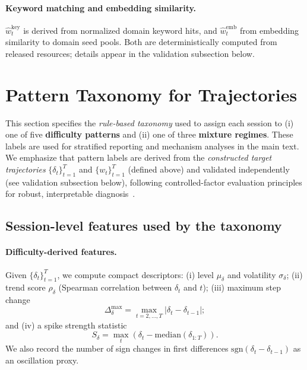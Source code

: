\paragraph{Keyword matching and embedding similarity.}
$\hat{w}^{\text{key}}_t$ is derived from normalized domain keyword hits, and $\hat{w}^{\text{emb}}_t$ from embedding similarity to domain seed pools. Both are deterministically computed from released resources; details appear in the validation subsection below.

\section{Pattern Taxonomy for Trajectories}
\label{app:pattern_taxonomy}

This section specifies the \emph{rule-based taxonomy} used to assign each session to
(i) one of five \textbf{difficulty patterns} and
(ii) one of three \textbf{mixture regimes}.
These labels are used for stratified reporting and mechanism analyses in the main text.
We emphasize that pattern labels are derived from the \emph{constructed target trajectories} $\{\delta_t\}_{t=1}^{T}$ and $\{w_t\}_{t=1}^{T}$ (defined above) and validated independently (see validation subsection below), following controlled-factor evaluation principles for robust, interpretable diagnosis~\citep{liang2022helm,kiela-etal-2021-dynabench,ribeiro-etal-2020-beyond}.

\subsection{Session-level features used by the taxonomy}
\label{app:pattern_features}

\paragraph{Difficulty-derived features.}
Given $\{\delta_t\}_{t=1}^{T}$, we compute compact descriptors:
(i) level $\mu_\delta$ and volatility $\sigma_\delta$;
(ii) trend score $\rho_\delta$ (Spearman correlation between $\delta_t$ and $t$);
(iii) maximum step change
\begin{equation}
\label{eq:delta_stepmax}
\Delta^{\max}_\delta = \max_{t=2,\ldots,T} \left|\delta_t-\delta_{t-1}\right|;
\end{equation}
and (iv) a spike strength statistic
\begin{equation}
\label{eq:delta_spike_strength}
S_\delta = \max_{t} \left(\delta_t - \mathrm{median}\left(\delta_{1:T}\right)\right).
\end{equation}
We also record the number of sign changes in first differences $\mathrm{sgn}\left(\delta_t-\delta_{t-1}\right)$ as an oscillation proxy.

